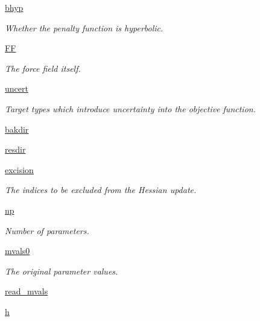 \begin{DoxyCompactItemize}
\hyperlink{classsrc_1_1optimizer_1_1Optimizer_aef24b36c1ff90fb15a372e2b0e0548a7}{bhyp}
\begin{DoxyCompactList}\small\item\em Whether the penalty function is hyperbolic. \end{DoxyCompactList}\item 
\hyperlink{classsrc_1_1optimizer_1_1Optimizer_a4bbc39a0dc533c4d9caeb5516030dd26}{FF}
\begin{DoxyCompactList}\small\item\em The force field itself. \end{DoxyCompactList}\item 
\hyperlink{classsrc_1_1optimizer_1_1Optimizer_aa75c8d8660bf183bd4177227a9d4e698}{uncert}
\begin{DoxyCompactList}\small\item\em Target types which introduce uncertainty into the objective function. \end{DoxyCompactList}\item 
\hyperlink{classsrc_1_1optimizer_1_1Optimizer_a19f27eb029d508ab0d559ed78c0864dc}{bakdir}
\item 
\hyperlink{classsrc_1_1optimizer_1_1Optimizer_adbf584d06545ac2417ea8d161ec33b88}{resdir}
\item 
\hyperlink{classsrc_1_1optimizer_1_1Optimizer_a84a28baeab6921fa32b5d41e477f6acb}{excision}
\begin{DoxyCompactList}\small\item\em The indices to be excluded from the Hessian update. \end{DoxyCompactList}\item 
\hyperlink{classsrc_1_1optimizer_1_1Optimizer_aa88255b5af98339a1f3a3a5f8e40aaef}{np}
\begin{DoxyCompactList}\small\item\em Number of parameters. \end{DoxyCompactList}\item 
\hyperlink{classsrc_1_1optimizer_1_1Optimizer_a05096b5b576287250088e3883597fd09}{mvals0}
\begin{DoxyCompactList}\small\item\em The original parameter values. \end{DoxyCompactList}\item 
\hyperlink{classsrc_1_1optimizer_1_1Optimizer_a373fa24d60747446426864a4112246f0}{read\+\_\+mvals}
\item 
\hyperlink{classsrc_1_1optimizer_1_1Optimizer_a5d39927fdc1835e26cf274608334993c}{h}

\end{DoxyCompactItemize}
